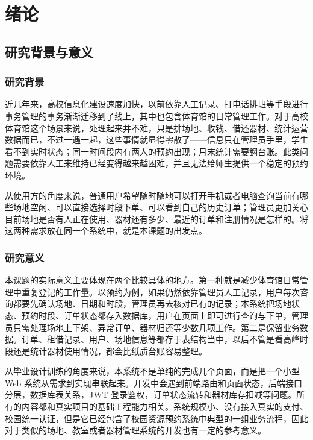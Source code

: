
\clearpage
\setcounter{page}{1}

\chapter{绪论}

\section{研究背景与意义}

\subsection{研究背景}

近几年来，高校信息化建设速度加快，以前依靠人工记录、打电话排班等手段进行事务管理的事务渐渐迁移到了线上，其中也包含体育馆的日常管理工作。对于高校体育馆这个场景来说，处理起来并不难，只是排场地、收钱、借还器材、统计运营数据而已，不过一遇一起，这些事情就显得零散了——信息只在管理员手里，学生看不到实时状态；同一时间段内有两人的预约出现；月末统计需要翻台账。此类问题需要依靠人工来维持已经变得越来越困难，并且无法给师生提供一个稳定的预约环境。

从使用方的角度来说，普通用户希望随时随地可以打开手机或者电脑查询当前有哪些场地空闲、可以直接选择时段下单、可以看到自己的历史订单；管理员更加关心目前场地是否有人正在使用、器材还有多少、最近的订单和注册情况是怎样的。将这两种需求放在同一个系统中，就是本课题的出发点。

\subsection{研究意义}

本课题的实际意义主要体现在两个比较具体的地方。第一种就是减少体育馆日常管理中重复登记的工作量。以预约为例，如果仍然依靠管理员人工记录，用户每次咨询都要先确认场地、日期和时段，管理员再去核对已有的记录；本系统把场地状态、预约时段、订单状态都存入数据库，用户在页面上即可进行查询与下单，管理员只需处理场地上下架、异常订单、器材归还等少数几项工作。第二是保留业务数据。订单、租借记录、用户、场地信息等都存于表结构当中，以后不管是看高峰时段还是统计器材使用情况，都会比纸质台账容易整理。

从毕业设计训练的角度来说，本系统不是单纯的完成几个页面，而是把一个小型 Web 系统从需求到实现串联起来。开发中会遇到前端路由和页面状态，后端接口分层，数据库表关系，JWT 登录鉴权，订单状态流转和器材库存扣减等问题。所有的内容都和真实项目的基础工程能力相关。系统规模小、没有接入真实的支付、校园统一认证，但是它已经包含了校园资源预约系统中典型的一组业务流程，因此对于类似的场地、教室或者器材管理系统的开发也有一定的参考意义。

